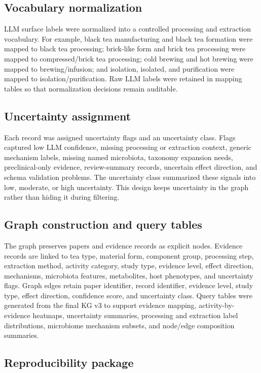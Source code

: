 \documentclass[11pt]{article}
\begin{document}
\subsection{Vocabulary normalization}

LLM surface labels were normalized into a controlled processing and extraction vocabulary. For example, black tea manufacturing and black tea formation were mapped to black tea processing; brick-like form and brick tea processing were mapped to compressed/brick tea processing; cold brewing and hot brewing were mapped to brewing/infusion; and isolation, isolated, and purification were mapped to isolation/purification. Raw LLM labels were retained in mapping tables so that normalization decisions remain auditable.

\subsection{Uncertainty assignment}

Each record was assigned uncertainty flags and an uncertainty class. Flags captured low LLM confidence, missing processing or extraction context, generic mechanism labels, missing named microbiota, taxonomy expansion needs, preclinical-only evidence, review-summary records, uncertain effect direction, and schema validation problems. The uncertainty class summarized these signals into low, moderate, or high uncertainty. This design keeps uncertainty in the graph rather than hiding it during filtering.

\subsection{Graph construction and query tables}

The graph preserves papers and evidence records as explicit nodes. Evidence records are linked to tea type, material form, component group, processing step, extraction method, activity category, study type, evidence level, effect direction, mechanisms, microbiota features, metabolites, host phenotypes, and uncertainty flags. Graph edges retain paper identifier, record identifier, evidence level, study type, effect direction, confidence score, and uncertainty class. Query tables were generated from the final KG v3 to support evidence mapping, activity-by-evidence heatmaps, uncertainty summaries, processing and extraction label distributions, microbiome mechanism subsets, and node/edge composition summaries.

\subsection{Reproducibility package}
\end{document}
